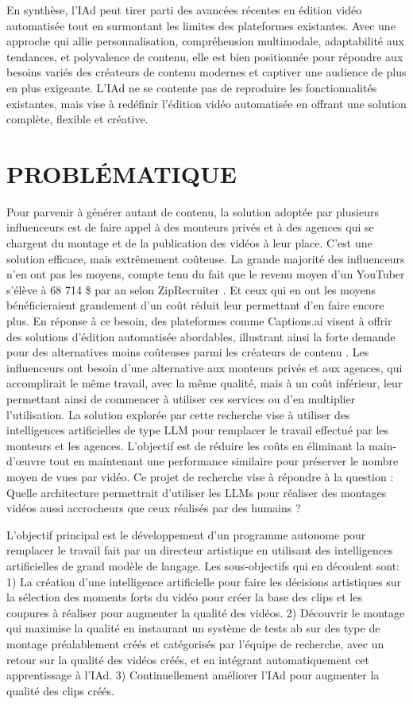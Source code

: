 \documentclass[livre]{udes-genie-these}
\begin{document}
En synthèse, l'IAd peut tirer parti des avancées récentes en édition vidéo automatisée tout en surmontant les limites des plateformes existantes. Avec une approche qui allie personnalisation, compréhension multimodale, adaptabilité aux tendances, et polyvalence de contenu, elle est bien positionnée pour répondre aux besoins variés des créateurs de contenu modernes et captiver une audience de plus en plus exigeante. L'IAd ne se contente pas de reproduire les fonctionnalités existantes, mais vise à redéfinir l'édition vidéo automatisée en offrant une solution complète, flexible et créative.


\chapter{PROBLÉMATIQUE}

Pour parvenir à générer autant de contenu, la solution adoptée par plusieurs influenceurs est de faire appel à des monteurs privés et à des agences qui se chargent du montage et de la publication des vidéos à leur place. C'est une solution efficace, mais extrêmement coûteuse. La grande majorité des influenceurs n'en ont pas les moyens, compte tenu du fait que le revenu moyen d'un YouTuber s'élève à 68 714 \$ par an selon ZipRecruiter \cite{financebuzz2024}. Et ceux qui en ont les moyens bénéficieraient grandement d'un coût réduit leur permettant d'en faire encore plus. En réponse à ce besoin, des plateformes comme Captions.ai visent à offrir des solutions d'édition automatisée abordables, illustrant ainsi la forte demande pour des alternatives moins coûteuses parmi les créateurs de contenu \cite{captions2024}.
Les influenceurs ont besoin d'une alternative aux monteurs privés et aux agences, qui accomplirait le même travail, avec la même qualité, mais à un coût inférieur, leur permettant ainsi de commencer à utiliser ces services ou d'en multiplier l'utilisation.
La solution explorée par cette recherche vise à utiliser des intelligences artificielles de type LLM pour remplacer le travail effectué par les monteurs et les agences. L'objectif est de réduire les coûts en éliminant la main-d'œuvre tout en maintenant une performance similaire pour préserver le nombre moyen de vues par vidéo.
Ce projet de recherche vise à répondre à la question :
Quelle architecture permettrait d'utiliser les LLMs pour réaliser des montages vidéos aussi accrocheurs que ceux réalisés par des humains ?

L'objectif principal est le développement d'un programme autonome pour remplacer le travail fait par un directeur artistique en utilisant des intelligences artificielles de grand modèle de langage. Les sous-objectifs qui en découlent sont: 1) La création d'une intelligence artificielle pour faire les décisions artistiques sur la sélection des moments forts du vidéo pour créer la base des clips et les coupures à réaliser pour augmenter la qualité des vidéos. 2) Découvrir le montage qui maximise la qualité en instaurant un système de tests ab sur des type de montage préalablement créés et catégorisés par l'équipe de recherche, avec un retour sur la qualité des vidéos créés, et en intégrant automatiquement cet apprentissage à l'IAd. 3) Continuellement améliorer l'IAd pour augmenter la qualité des clips créés.
\end{document}

